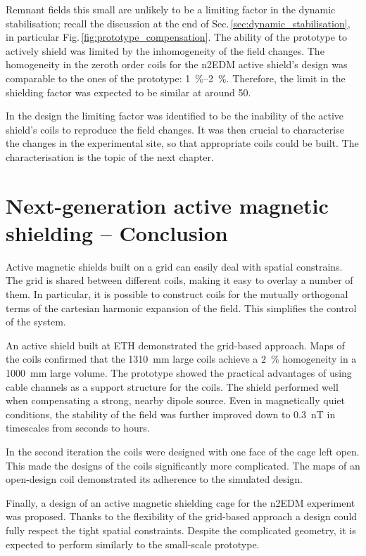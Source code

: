 Remnant fields this small are unlikely to be a limiting factor in the dynamic stabilisation; recall the discussion at the end of Sec.\,\ref{sec:dynamic_stabilisation}, in particular Fig.\,\ref{fig:prototype_compensation}.
The ability of the prototype to actively shield was limited by the inhomogeneity of the field changes.
The homogeneity in the zeroth order coils for the n2EDM active shield's design was comparable to the ones of the prototype: \SIrange[range-phrase=--,range-units=single]{1}{2}{\percent}.
Therefore, the limit in the shielding factor was expected to be similar at around 50.

In the design the limiting factor was identified to be the inability of the active shield's coils to reproduce the field changes.
It was then crucial to characterise the changes in the experimental site, so that appropriate coils could be built.
The characterisation is the topic of the next chapter.




\section*{Next-generation active magnetic shielding -- Conclusion}
Active magnetic shields built on a grid can easily deal with spatial constrains.
The grid is shared between different coils, making it easy to overlay a number of them.
In particular, it is possible to construct coils for the mutually orthogonal terms of the cartesian harmonic expansion of the field.
This simplifies the control of the system.

An active shield built at ETH demonstrated the grid-based approach.
Maps of the coils confirmed that the \SI{1310}{\milli\metre} large coils achieve a \SI{2}{\percent} homogeneity in a \SI{1000}{\milli\metre} large volume.
The prototype showed the practical advantages of using cable channels as a support structure for the coils.
The shield performed well when compensating a strong, nearby dipole source.
Even in magnetically quiet conditions, the stability of the field was further improved down to \SI{0.3}{\nano\tesla} in timescales from seconds to hours.

In the second iteration the coils were designed with one face of the cage left open.
This made the designs of the coils significantly more complicated.
The maps of an open-design coil demonstrated its adherence to the simulated design.

Finally, a design of an active magnetic shielding cage for the n2EDM experiment was proposed.
Thanks to the flexibility of the grid-based approach a design could fully respect the tight spatial constraints.
Despite the complicated geometry, it is expected to perform similarly to the small-scale prototype.
